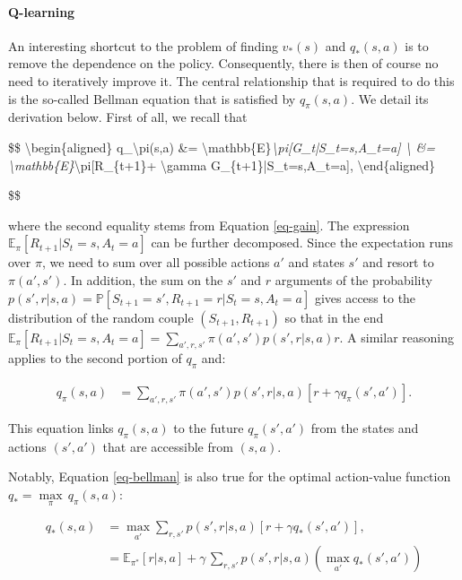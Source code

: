 \paragraph{Q-learning}

An interesting shortcut to the problem of finding $v_*(s)$ and $q_*(s,a)$ is to remove the dependence on the policy. Consequently, there is then of course no need to iteratively improve it. The central relationship that is required to do this is the so-called Bellman equation that is satisfied by $q_\pi(s,a)$. We detail its derivation below. First of all, we recall that

\$\$
{\textbackslash}begin\{aligned\}
q\_{\textbackslash}pi(s,a) \&= {\textbackslash}mathbb\{E\}\textit{{\textbackslash}pi[G\_t|S\_t=s,A\_t=a] {\textbackslash}
\&= {\textbackslash}mathbb\{E\}}{\textbackslash}pi[R\_\{t+1\}+ {\textbackslash}gamma G\_\{t+1\}|S\_t=s,A\_t=a],
{\textbackslash}end\{aligned\}

\$\$

where the second equality stems from Equation \ref{eq-gain}. The expression $\mathbb{E}_\pi[R_{t+1}|S_t=s,A_t=a]$ can be further decomposed. Since the expectation runs over $\pi$, we need to sum over all possible actions $a'$ and states $s'$ and resort to $\pi(a',s')$. In addition, the sum on the $s'$ and $r$ arguments of the probability $p(s',r|s,a)=\mathbb{P}\left[S_{t+1}=s',R_{t+1}=r | S_t=s,A_t=a \right]$ gives access to the distribution of the random couple $(S_{t+1},R_{t+1})$ so that in the end $\mathbb{E}_\pi[R_{t+1}|S_t=s,A_t=a]=\sum_{a', r,s'}\pi(a',s')p(s',r|s,a)  r$. A similar reasoning applies to the second portion of $q_\pi$ and:

\begin{equation}
\label{eq-bellman}
\begin{aligned}
q_\pi(s,a) &=\sum_{a',r, s'}\pi(a',s')p(s',r|s,a) \left[ r+\gamma q_\pi(s',a')\right].
\end{aligned}
\end{equation}

This equation links $q_\pi(s,a)$ to the future $q_\pi(s',a')$ from the states and actions $(s',a')$ that are accessible from $(s,a)$.

Notably, Equation \ref{eq-bellman} is also true for the optimal action-value function $q_*=\underset{\pi}{\max} \, q_\pi(s,a)$:

\begin{equation}
\label{eq-bellmanq}
\begin{aligned}
q_*(s,a) &= \underset{a'}{\max} \sum_{r,s'}p(s',r|s,a) \left[ r+\gamma q_*(s',a')\right], \\ 
&= \mathbb{E}_{\pi^*}[r|s,a]+ \gamma \, \sum_{r,s'}p(s',r|s,a) \left(  \underset{a'}{\max}  q_*(s',a') \right)
\end{aligned}
\end{equation}

